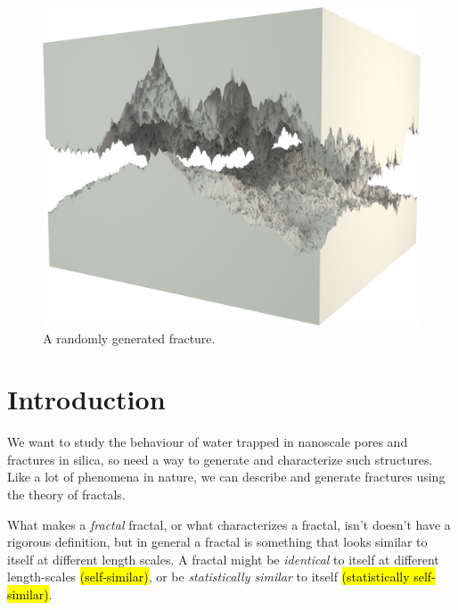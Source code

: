 \vspace*{\fill}
\begin{figure}[hp!]%
\thispagestyle{empty}
    \centering%
    \includegraphics[width=\textwidth]{images/fracture/large_fracture05.jpg}%
    \caption{%
        A randomly generated fracture.%
    }%
\end{figure}%
\vspace{\fill}

\chapter{Introduction}
We want to study the behaviour of water trapped in nanoscale pores and fractures in silica, so need a way to generate and characterize such structures. Like a lot of phenomena in nature, we can describe and generate fractures using the theory of fractals\cite{mandelbrot1983fractal}.

What makes a \emph{fractal} fractal, or what characterizes a fractal, isn't doesn't have a rigorous definition, but in general a fractal is something that looks similar to itself at different length scales. A fractal might be \emph{identical} to itself at different length-scales \hl{(self-similar)}, or be \emph{statistically similar} to itself \hl{(statistically self-similar)}.

